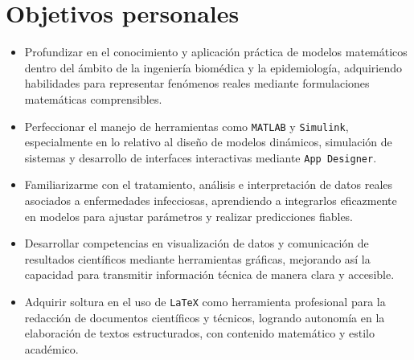 \section{Objetivos personales}
\begin{itemize}
\item Profundizar en el conocimiento y aplicación práctica de modelos matemáticos dentro del ámbito de la ingeniería biomédica y la epidemiología, adquiriendo habilidades para representar fenómenos reales mediante formulaciones matemáticas comprensibles.
\item Perfeccionar el manejo de herramientas como \texttt{MATLAB} y \texttt{Simulink}, especialmente en lo relativo al diseño de modelos dinámicos, simulación de sistemas y desarrollo de interfaces interactivas mediante \texttt{App Designer}.
\item Familiarizarme con el tratamiento, análisis e interpretación de datos reales asociados a enfermedades infecciosas, aprendiendo a integrarlos eficazmente en modelos para ajustar parámetros y realizar predicciones fiables.
\item Desarrollar competencias en visualización de datos y comunicación de resultados científicos mediante herramientas gráficas, mejorando así la capacidad para transmitir información técnica de manera clara y accesible.
\item Adquirir soltura en el uso de \texttt{LaTeX} como herramienta profesional para la redacción de documentos científicos y técnicos, logrando autonomía en la elaboración de textos estructurados, con contenido matemático y estilo académico.
\end{itemize}

